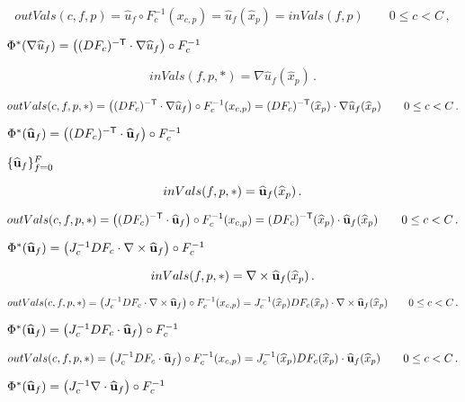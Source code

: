 \documentclass{article}
\begin{document}
\[
         outVals(c,f,p) 
            = \widehat{u}_f\circ F^{-1}_{c}(x_{c,p}) 
            = \widehat{u}_f(\widehat{x}_p) =  inVals(f,p) \qquad 0\le c < C \,,
  \]
\pagebreak

$\Phi^*(\nabla\widehat{u}_f) = \left((DF_c)^{-{\sf T}}\cdot\nabla\widehat{u}_f\right)\circ F^{-1}_{c}$
\pagebreak

\[
         inVals(f,p,*) = \nabla\widehat{u}_f(\widehat{x}_p) \,.
  \]
\pagebreak

\[
         outVals(c,f,p,*) 
              = \left((DF_c)^{-{\sf T}}\cdot\nabla\widehat{u}_f\right)\circ F^{-1}_{c}(x_{c,p}) 
              = (DF_c)^{-{\sf T}}(\widehat{x}_p)\cdot\nabla\widehat{u}_f(\widehat{x}_p) \qquad 0\le c < C \,.
  \]
\pagebreak

$\Phi^*(\widehat{\bf u}_f) = \left((DF_c)^{-{\sf T}}\cdot\widehat{\bf u}_f\right)\circ F^{-1}_{c}$
\pagebreak

$\{\widehat{\bf u}_f\}_{f=0}^{F}$
\pagebreak

\[
         inVals(f,p,*) = \widehat{\bf u}_f(\widehat{x}_p) \,.
  \]
\pagebreak

\[
          outVals(c,f,p,*) 
            = \left((DF_c)^{-{\sf T}}\cdot\widehat{\bf u}_f\right)\circ F^{-1}_{c}(x_{c,p}) 
            = (DF_c)^{-{\sf T}}(\widehat{x}_p)\cdot\widehat{\bf u}_f(\widehat{x}_p) \qquad 0\le c < C \,.
  \]
\pagebreak

$\Phi^*(\widehat{\bf u}_f) = \left(J^{-1}_{c} DF_{c}\cdot\nabla\times\widehat{\bf u}_f\right)\circ F^{-1}_{c}$
\pagebreak

\[
         inVals(f,p,*) = \nabla\times\widehat{\bf u}_f(\widehat{x}_p) \,.
  \]
\pagebreak

\[
         outVals(c,f,p,*) 
            = \left(J^{-1}_{c} DF_{c}\cdot\nabla\times\widehat{\bf u}_f\right)\circ F^{-1}_{c}(x_{c,p}) 
            = J^{-1}_{c}(\widehat{x}_p) DF_{c}(\widehat{x}_p)\cdot\nabla\times\widehat{\bf u}_f(\widehat{x}_p)
          \qquad 0\le c < C \,.
  \]
\pagebreak

$\Phi^*(\widehat{\bf u}_f) = \left(J^{-1}_{c} DF_{c}\cdot\widehat{\bf u}_f\right)\circ F^{-1}_{c} $
\pagebreak

\[
         outVals(c,f,p,*) 
          = \left(J^{-1}_{c} DF_{c}\cdot \widehat{\bf u}_f\right)\circ F^{-1}_{c}(x_{c,p}) 
          = J^{-1}_{c}(\widehat{x}_p) DF_{c}(\widehat{x}_p)\cdot\widehat{\bf u}_f(\widehat{x}_p)
          \qquad 0\le c < C \,.
  \]
\pagebreak

$\Phi^*(\widehat{\bf u}_f) = \left(J^{-1}_{c}\nabla\cdot\widehat{\bf u}_{f}\right) \circ F^{-1}_{c} $
\pagebreak
\end{document}
